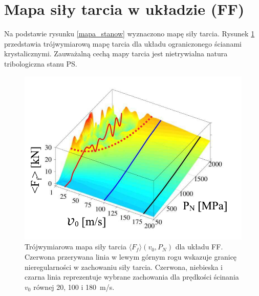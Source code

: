 \documentclass[12pt,a4paper,openright]{report} %
\begin{document}
\section{Mapa siły tarcia w układzie (FF)}
%
%
Na podstawie rysunku \ref{mapa_stanow} wyznaczono mapę siły tarcia.
%
Rysunek \ref{mapa3DFF} przedstawia trójwymiarową mapę tarcia dla układu ograniczonego ścianami krystalicznymi.
Zauważalną cechą mapy tarcia jest nietrywialna natura tribologiczna stanu PS. 
%
\begin{figure}[h]
\centering
\includegraphics[width=120mm]{rysunki/PRE16_fig13.pdf}
\caption{Trójwymiarowa mapa siły tarcia $\langle F_f \rangle(v_0, P_N)$ dla układu FF. Czerwona przerywana linia w lewym górnym rogu wskazuje granicę nieregularności w zachowaniu siły tarcia. Czerwona, niebieska i czarna linia reprezentuje wybrane zachowania dla prędkości ścinania $v_0$ równej 20, 100 i 180~m/s.}
\label{mapa3DFF}
\end{figure}
%
%
\end{document}
